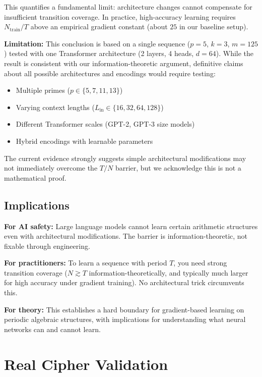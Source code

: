 \documentclass[11pt]{article}
\theoremstyle{plain}
\theoremstyle{definition}
\begin{document}
This quantifies a fundamental limit: architecture changes cannot compensate for insufficient transition coverage. In practice, high-accuracy learning requires $N_{\mathrm{train}}/T$ above an empirical gradient constant (about $25$ in our baseline setup).

\textbf{Limitation:} This conclusion is based on a single sequence ($p=5$, $k=3$, $m=125$) tested with one Transformer architecture (2 layers, 4 heads, $d=64$). While the result is consistent with our information-theoretic argument, definitive claims about all possible architectures and encodings would require testing:
\begin{itemize}[leftmargin=2em]
\item Multiple primes ($p \in \{5, 7, 11, 13\}$)
\item Varying context lengths ($L_{\mathrm{in}} \in \{16, 32, 64, 128\}$)
\item Different Transformer scales (GPT-2, GPT-3 size models)
\item Hybrid encodings with learnable parameters
\end{itemize}
The current evidence strongly suggests simple architectural modifications may not immediately overcome the $T/N$ barrier, but we acknowledge this is not a mathematical proof.

\subsection{Implications}

\textbf{For AI safety:} Large language models cannot learn certain arithmetic structures even with architectural modifications. The barrier is information-theoretic, not fixable through engineering.

\textbf{For practitioners:} To learn a sequence with period $T$, you need strong transition coverage ($N \gtrsim T$ information-theoretically, and typically much larger for high accuracy under gradient training). No architectural trick circumvents this.

\textbf{For theory:} This establishes a hard boundary for gradient-based learning on periodic algebraic structures, with implications for understanding what neural networks can and cannot learn.

\section{Real Cipher Validation}
\label{sec:real_ciphers}
\end{document}
